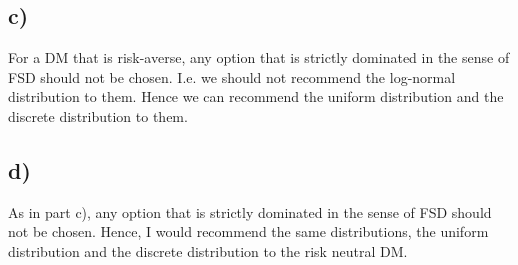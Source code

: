 \documentclass{article}
\begin{document}
\subsection{c)}
	For a DM that is risk-averse, any option that is strictly dominated in the sense of FSD should not be chosen. I.e. we should not recommend the log-normal distribution to them. 
	Hence we can recommend the uniform distribution and the discrete distribution to them.
\subsection{d)}
	As in part c), any option that is strictly dominated in the sense of FSD should not be chosen. Hence, I would recommend the same distributions, the uniform distribution and the discrete distribution to the risk neutral DM.
	
\end{document}
